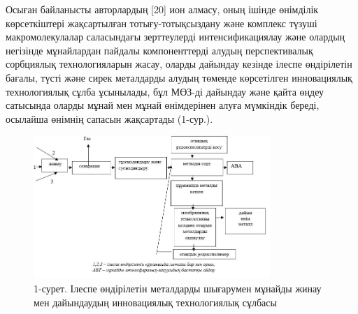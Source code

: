 \begin{multicols}{2}
Осыған байланысты авторлардың {[}20{]} ион алмасу, оның ішінде өнімділік
көрсеткіштері жақсартылған тотығу-тотықсыздану және комплекс түзуші
макромолекулалар саласындағы зерттеулерді интенсификациялау және олардың
негізінде мұнайлардан пайдалы компоненттерді алудың перспективалық
сорбциялық технологияларын жасау, оларды дайындау кезінде ілеспе
өндірілетін бағалы, түсті және сирек металдарды алудың төменде
көрсетілген инновациялық технологиялық сұлба ұсынылады, бұл МӨЗ-ді
дайындау және қайта өңдеу сатысында оларды мұнай мен мұнай өнімдерінен
алуға мүмкіндік береді, осылайша өнімнің сапасын жақсартады (1-сур.).
\end{multicols}


\begin{figure}[H]
	\centering
	\includegraphics[width=0.8\textwidth]{media/gor/image21.2}
	\caption*{1-сурет. Ілеспе өндірілетін металдарды шығарумен мұнайды жинау
  мен дайындаудың инновациялық технологиялық сұлбасы}
\end{figure}

